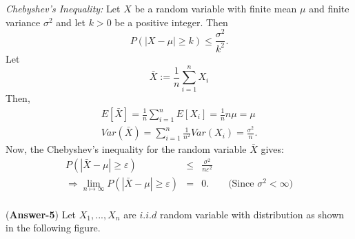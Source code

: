 \documentclass[11pt,twoside,reqno]{article}
\begin{document}
\textit{Chebyshev's Inequality:} Let $X $ be a random variable with finite mean $\mu$ and finite variance $\sigma^2$ and let $k > 0$ be a positive integer. Then
\[
P(|X - \mu| \geq k) \leq \frac{\sigma^2}{k^2}.
\]
Let  
\[
\bar{X} := \frac{1}{n} \sum_{i=1}^n X_i
\]
Then,
\begin{eqnarray*}
E[\bar{X}] = \frac{1}{n}\sum_{i=1}^n E[X_i] = \frac{1}{n} n \mu = \mu \\
Var(\bar{X}) = \sum_{i=1}^n \frac{1}{n^2}Var(X_i) = \frac{\sigma^2}{n}.
\end{eqnarray*}
Now, the Chebyshev's inequality for the random variable $\bar{X}$ gives:
\begin{eqnarray*}
P(|\bar{X} - \mu| \geq \varepsilon) &\leq& \frac{\sigma^2}{n \varepsilon^2} \\
\Rightarrow \lim\limits_{n\mapsto \infty} P(|\bar{X} - \mu| \geq \varepsilon) &= &0. \quad \quad \text{(Since $\sigma^2 < \infty$)}
\end{eqnarray*}
\\
({\bf Answer-5})
Let $X_1,...,X_n$ are $i.i.d$ random variable with distribution as shown in the following figure.
\begin{center}
\end{center}
\end{document}
